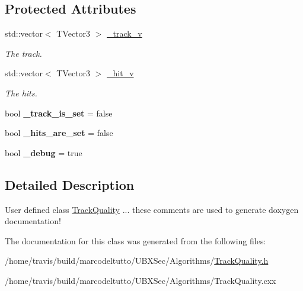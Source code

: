 \subsection*{Protected Attributes}
\begin{DoxyCompactItemize}
\item 
\hypertarget{classubana_1_1TrackQuality_a11971e9f972bc27655fd61c4dbb1a968}{std\-::vector$<$ T\-Vector3 $>$ \hyperlink{classubana_1_1TrackQuality_a11971e9f972bc27655fd61c4dbb1a968}{\-\_\-track\-\_\-v}}\label{classubana_1_1TrackQuality_a11971e9f972bc27655fd61c4dbb1a968}

\begin{DoxyCompactList}\small\item\em The track. \end{DoxyCompactList}\item 
\hypertarget{classubana_1_1TrackQuality_a1975a23a4dda1608199d4566321df300}{std\-::vector$<$ T\-Vector3 $>$ \hyperlink{classubana_1_1TrackQuality_a1975a23a4dda1608199d4566321df300}{\-\_\-hit\-\_\-v}}\label{classubana_1_1TrackQuality_a1975a23a4dda1608199d4566321df300}

\begin{DoxyCompactList}\small\item\em The hits. \end{DoxyCompactList}\item 
\hypertarget{classubana_1_1TrackQuality_ac11597aa4ac7214c06676cc4aa72d212}{bool {\bfseries \-\_\-track\-\_\-is\-\_\-set} = false}\label{classubana_1_1TrackQuality_ac11597aa4ac7214c06676cc4aa72d212}

\item 
\hypertarget{classubana_1_1TrackQuality_abd09b403297a31dce86e6a8e14c0aa15}{bool {\bfseries \-\_\-hits\-\_\-are\-\_\-set} = false}\label{classubana_1_1TrackQuality_abd09b403297a31dce86e6a8e14c0aa15}

\item 
\hypertarget{classubana_1_1TrackQuality_a891d785096de70af161e8e31b50ed706}{bool {\bfseries \-\_\-debug} = true}\label{classubana_1_1TrackQuality_a891d785096de70af161e8e31b50ed706}

\end{DoxyCompactItemize}


\subsection{Detailed Description}
User defined class \hyperlink{classubana_1_1TrackQuality}{Track\-Quality} ... these comments are used to generate doxygen documentation! 

The documentation for this class was generated from the following files\-:\begin{DoxyCompactItemize}
\item 
/home/travis/build/marcodeltutto/\-U\-B\-X\-Sec/\-Algorithms/\hyperlink{TrackQuality_8h}{Track\-Quality.\-h}\item 
/home/travis/build/marcodeltutto/\-U\-B\-X\-Sec/\-Algorithms/Track\-Quality.\-cxx\end{DoxyCompactItemize}
